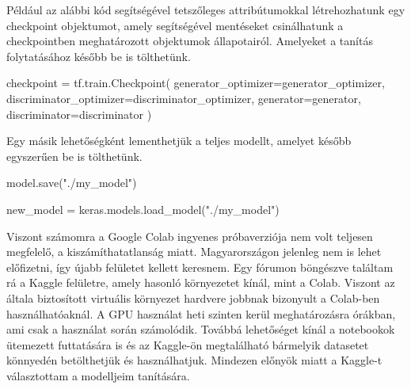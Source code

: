 Például az alábbi kód segítségével tetszőleges attribútumokkal létrehozhatunk egy checkpoint objektumot, amely segítségével mentéseket csinálhatunk a checkpointben meghatározott objektumok állapotairól. Amelyeket a tanítás folytatásához később be is tölthetünk.
\begin{python}
checkpoint = tf.train.Checkpoint(
    generator_optimizer=generator_optimizer,
    discriminator_optimizer=discriminator_optimizer,
    generator=generator,
    discriminator=discriminator
)
\end{python}

Egy másik lehetőségként lementhetjük a teljes modellt, amelyet később egyszerűen be is tölthetünk.
\begin{python}
model.save("./my_model")

new_model = keras.models.load_model("./my_model")
\end{python}
Viszont számomra a Google Colab ingyenes próbaverziója nem volt teljesen megfelelő, a kiszámíthatatlanság miatt. Magyarországon jelenleg nem is lehet előfizetni, így újabb felületet kellett keresnem. Egy fórumon böngészve találtam rá a Kaggle felületre, amely hasonló környezetet kínál, mint a Colab. Viszont az általa biztosított virtuális környezet hardvere jobbnak bizonyult a Colab-ben használhatóaknál. A GPU használat heti szinten kerül meghatározásra órákban, ami csak a használat során számolódik. Továbbá lehetőséget kínál a notebookok ütemezett futtatására is és az Kaggle-ön megtalálható bármelyik datasetet könnyedén betölthetjük és használhatjuk. Mindezen előnyök miatt a Kaggle-t választottam a modelljeim tanítására.


